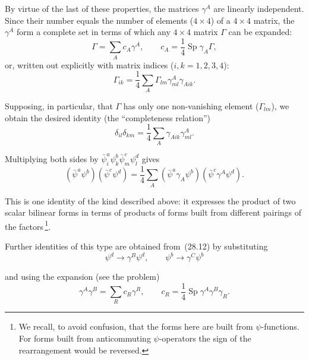 By virtue of the last of these properties, the matrices $\gamma^A$ are linearly independent. Since their number equals the number of elements ($4 \times 4$) of a $4 \times 4$ matrix, the $\gamma^A$ form a complete set in terms of which any $4 \times 4$ matrix $\Gamma$ can be expanded:
\begin{equation}
\Gamma = \sum_A c_A\gamma^A,\qquad c_A = \frac{1}{4}\operatorname{Sp}\gamma_A\Gamma,
\tag{28.10}
\end{equation}
or, written out explicitly with matrix indices ($i, k = 1, 2, 3, 4$):
\[
\Gamma_{ik} = \frac{1}{4}\sum_A\Gamma_{lm}\gamma^A_{ml}\gamma_{Aik}.
\]

Supposing, in particular, that $\Gamma$ has only one non-vanishing element ($\Gamma_{lm}$), we obtain the desired identity (the ``completeness relation'')
\begin{equation}
\delta_{il}\delta_{km} = \frac{1}{4}\sum_A\gamma_{Aik}\gamma^A_{ml}.
\tag{28.11}
\end{equation}

Multiplying both sides by $\bar\psi^a_i\psi^b_k\bar\psi^c_m\psi^d_l$ gives
\begin{equation}
(\bar\psi^a\psi^b)(\bar\psi^c\psi^d) = \frac{1}{4}\sum_A(\bar\psi^a\gamma_A\psi^b)(\bar\psi^c\gamma^A\psi^d).
\tag{28.12}
\end{equation}

This is one identity of the kind described above: it expresses the product of two scalar bilinear forms in terms of products of forms built from different pairings of the factors\,\footnote{We recall, to avoid confusion, that the forms here are built from $\psi$-functions. For forms built from anticommuting $\psi$-operators the sign of the rearrangement would be reversed.}.

Further identities of this type are obtained from~(28.12) by substituting
\[
\psi^d \to \gamma^B\psi^d,\qquad \psi^b \to \gamma^C\psi^b
\]

and using the expansion (see the problem)
\[
\gamma^A\gamma^B = \sum_R c_R\gamma^R,\qquad c_R = \frac{1}{4}\operatorname{Sp}\gamma^A\gamma^B\gamma_R.
\]

